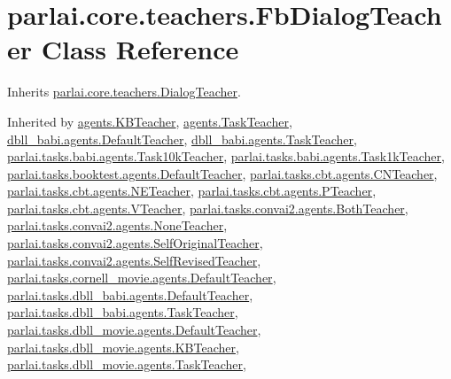 \hypertarget{classparlai_1_1core_1_1teachers_1_1FbDialogTeacher}{}\section{parlai.\+core.\+teachers.\+Fb\+Dialog\+Teacher Class Reference}
\label{classparlai_1_1core_1_1teachers_1_1FbDialogTeacher}


Inherits \hyperlink{classparlai_1_1core_1_1teachers_1_1DialogTeacher}{parlai.\+core.\+teachers.\+Dialog\+Teacher}.



Inherited by \hyperlink{classagents_1_1KBTeacher}{agents.\+K\+B\+Teacher}, \hyperlink{classagents_1_1TaskTeacher}{agents.\+Task\+Teacher}, \hyperlink{classdbll__babi_1_1agents_1_1DefaultTeacher}{dbll\+\_\+babi.\+agents.\+Default\+Teacher}, \hyperlink{classdbll__babi_1_1agents_1_1TaskTeacher}{dbll\+\_\+babi.\+agents.\+Task\+Teacher}, \hyperlink{classparlai_1_1tasks_1_1babi_1_1agents_1_1Task10kTeacher}{parlai.\+tasks.\+babi.\+agents.\+Task10k\+Teacher}, \hyperlink{classparlai_1_1tasks_1_1babi_1_1agents_1_1Task1kTeacher}{parlai.\+tasks.\+babi.\+agents.\+Task1k\+Teacher}, \hyperlink{classparlai_1_1tasks_1_1booktest_1_1agents_1_1DefaultTeacher}{parlai.\+tasks.\+booktest.\+agents.\+Default\+Teacher}, \hyperlink{classparlai_1_1tasks_1_1cbt_1_1agents_1_1CNTeacher}{parlai.\+tasks.\+cbt.\+agents.\+C\+N\+Teacher}, \hyperlink{classparlai_1_1tasks_1_1cbt_1_1agents_1_1NETeacher}{parlai.\+tasks.\+cbt.\+agents.\+N\+E\+Teacher}, \hyperlink{classparlai_1_1tasks_1_1cbt_1_1agents_1_1PTeacher}{parlai.\+tasks.\+cbt.\+agents.\+P\+Teacher}, \hyperlink{classparlai_1_1tasks_1_1cbt_1_1agents_1_1VTeacher}{parlai.\+tasks.\+cbt.\+agents.\+V\+Teacher}, \hyperlink{classparlai_1_1tasks_1_1convai2_1_1agents_1_1BothTeacher}{parlai.\+tasks.\+convai2.\+agents.\+Both\+Teacher}, \hyperlink{classparlai_1_1tasks_1_1convai2_1_1agents_1_1NoneTeacher}{parlai.\+tasks.\+convai2.\+agents.\+None\+Teacher}, \hyperlink{classparlai_1_1tasks_1_1convai2_1_1agents_1_1SelfOriginalTeacher}{parlai.\+tasks.\+convai2.\+agents.\+Self\+Original\+Teacher}, \hyperlink{classparlai_1_1tasks_1_1convai2_1_1agents_1_1SelfRevisedTeacher}{parlai.\+tasks.\+convai2.\+agents.\+Self\+Revised\+Teacher}, \hyperlink{classparlai_1_1tasks_1_1cornell__movie_1_1agents_1_1DefaultTeacher}{parlai.\+tasks.\+cornell\+\_\+movie.\+agents.\+Default\+Teacher}, \hyperlink{classparlai_1_1tasks_1_1dbll__babi_1_1agents_1_1DefaultTeacher}{parlai.\+tasks.\+dbll\+\_\+babi.\+agents.\+Default\+Teacher}, \hyperlink{classparlai_1_1tasks_1_1dbll__babi_1_1agents_1_1TaskTeacher}{parlai.\+tasks.\+dbll\+\_\+babi.\+agents.\+Task\+Teacher}, \hyperlink{classparlai_1_1tasks_1_1dbll__movie_1_1agents_1_1DefaultTeacher}{parlai.\+tasks.\+dbll\+\_\+movie.\+agents.\+Default\+Teacher}, \hyperlink{classparlai_1_1tasks_1_1dbll__movie_1_1agents_1_1KBTeacher}{parlai.\+tasks.\+dbll\+\_\+movie.\+agents.\+K\+B\+Teacher}, \hyperlink{classparlai_1_1tasks_1_1dbll__movie_1_1agents_1_1TaskTeacher}{parlai.\+tasks.\+dbll\+\_\+movie.\+agents.\+Task\+Teacher}, 